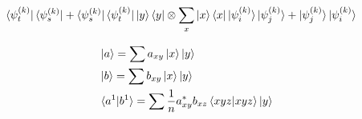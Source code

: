 \documentclass[manuscript,screen,review]{acmart}
\begin{document}
\begin{equation*}
  \begin{split}
&\bra{\psi^{(k)}_{t}}\bra{\psi^{(k)}_{s}}+\bra{\psi^{(k)}_{s}}\bra{\psi^{(k)}_{t}}       \ket{y}\bra{y}\otimes \sum_{x}{\ket{x}\bra{x}}   \ket{\psi^{(k)}_{i}}\ket{\psi^{(k)}_{j}}+\ket{\psi^{(k)}_{j}}\ket{\psi^{(k)}_{i}}   \end{split}
\end{equation*}



\begin{equation*}
  \begin{split}
    & \ket{a} = \sum a_{xy}\ket{x}\ket{y} \\
    & \ket{b} = \sum b_{xy}\ket{x}\ket{y} \\ 
    & \braket{a^{1}|b^{1}} = \sum \frac{1}{n}a_{xy}^{*}b_{xz}\braket{xyz|xyz}\ket{y}
  \end{split}
\end{equation*}


 




\printbibliography
\end{document}
